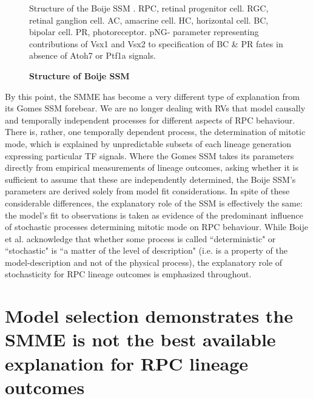 \begin{figure}[!h]
\caption{{\bf Structure of Boije SSM}}
Structure of the Boije SSM \cite{Boije2015}. RPC, retinal progenitor cell. RGC, retinal ganglion cell. AC, amacrine cell. HC, horizontal cell. BC, bipolar cell. PR, photoreceptor. pNG- parameter representing contributions of Vsx1 and Vsx2 to specification of BC \& PR fates in absence of Atoh7 or Ptf1a signals.
\label{BoijeSSM}
\end{figure}

By this point, the SMME has become a very different type of explanation from its Gomes SSM forebear. We are no longer dealing with RVs that model causally and temporally independent processes for different aspects of RPC behaviour. There is, rather, one temporally dependent process, the determination of mitotic mode, which is explained by unpredictable subsets of each lineage generation expressing particular TF signals. Where the Gomes SSM takes its parameters directly from empirical measurements of lineage outcomes, asking whether it is sufficient to assume that these are independently determined, the Boije SSM's parameters are derived solely from model fit considerations. In spite of these considerable differences, the explanatory role of the SSM is effectively the same: the model's fit to observations is taken as evidence of the predominant influence of stochastic processes determining mitotic mode on RPC behaviour. While Boije et al. acknowledge that whether some process is called ``deterministic" or ``stochastic" is ``a matter of the level of description" \cite{Boije2015} (i.e. is a property of the model-description and not of the physical process), the explanatory role of stochasticity for RPC lineage outcomes is emphasized throughout.
 
 \section{Model selection demonstrates the SMME is not the best available explanation for RPC lineage outcomes}
 
